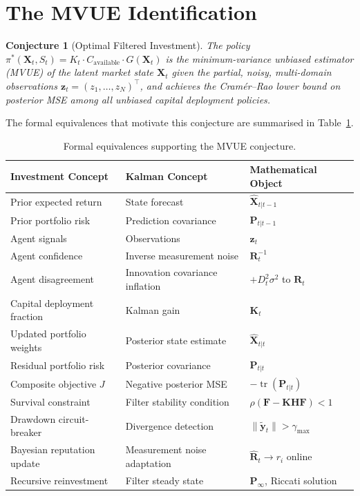 \documentclass[12pt,openany]{book}
\DeclareMathOperator{\tr}{tr}
\numberwithin{equation}{chapter}
\theoremstyle{plain}
\newtheorem{conjecture}[theorem]{Conjecture}
\theoremstyle{definition}
\theoremstyle{remark}
\begin{document}
\section{The MVUE Identification}

\begin{conjecture}[Optimal Filtered Investment]
\label{conj:mvue}
The policy $\pi^*(\mathbf{X}_t, S_t) = K_t \cdot
C_{\mathrm{available}} \cdot G(\mathbf{X}_t)$ is the minimum-variance
unbiased estimator (MVUE) of the latent market state
$\mathbf{X}_t$ given the partial, noisy, multi-domain
observations $\mathbf{z}_t = (z_1, \ldots, z_N)^\top$, and
achieves the Cram\'{e}r--Rao lower bound on posterior MSE among
all unbiased capital deployment policies.
\end{conjecture}

\noindent
The formal equivalences that motivate this conjecture are
summarised in Table~\ref{tab:mvue}.

\begin{table}[H]
\centering
\caption{Formal equivalences supporting the MVUE conjecture.}
\label{tab:mvue}
\small
\begin{tabularx}{\linewidth}{@{} l l X @{}}
\toprule
\textbf{Investment Concept} & \textbf{Kalman Concept}
  & \textbf{Mathematical Object} \\
\midrule
Prior expected return & State forecast
  & $\hat{\mathbf{X}}_{t|t-1}$ \\
Prior portfolio risk & Prediction covariance
  & $\mathbf{P}_{t|t-1}$ \\
Agent signals & Observations
  & $\mathbf{z}_t$ \\
Agent confidence & Inverse measurement noise
  & $\mathbf{R}_t^{-1}$ \\
Agent disagreement & Innovation covariance inflation
  & $+D_t^2\sigma^2$ to $\mathbf{R}_t$ \\
Capital deployment fraction & Kalman gain
  & $\mathbf{K}_t$ \\
Updated portfolio weights & Posterior state estimate
  & $\hat{\mathbf{X}}_{t|t}$ \\
Residual portfolio risk & Posterior covariance
  & $\mathbf{P}_{t|t}$ \\
Composite objective $J$ & Negative posterior MSE
  & $-\tr(\mathbf{P}_{t|t})$ \\
Survival constraint & Filter stability condition
  & $\rho(\mathbf{F} - \mathbf{K}\mathbf{H}\mathbf{F}) < 1$ \\
Drawdown circuit-breaker & Divergence detection
  & $\|\tilde{\mathbf{y}}_t\| > \gamma_{\max}$ \\
Bayesian reputation update & Measurement noise adaptation
  & $\hat{\mathbf{R}}_t \to r_i$ online \\
Recursive reinvestment & Filter steady state
  & $\mathbf{P}_\infty$, Riccati solution \\
\bottomrule
\end{tabularx}
\end{table}
\end{document}
